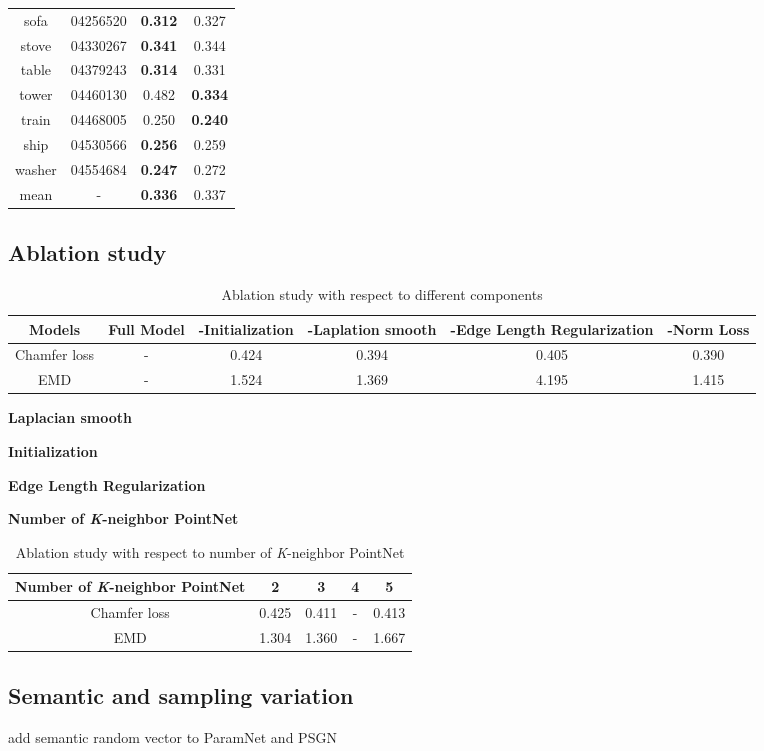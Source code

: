 \begin{table}
\begin{tabular}{c c c c}
		sofa & 04256520 & {\color{blue}\textbf{0.312}} & 0.327\\
		stove & 04330267 & {\color{blue}\textbf{0.341}} & 0.344\\
		table & 04379243 & {\color{blue}\textbf{0.314}} & 0.331\\
		tower & 04460130 & 0.482 & {\color{blue}\textbf{0.334}}\\
		train & 04468005 & 0.250 & {\color{blue}\textbf{0.240}}\\
		ship  & 04530566 & {\color{blue}\textbf{0.256}} & 0.259\\
		washer &  04554684 & {\color{blue}\textbf{0.247}} & 0.272\\
		mean   &     -     & {\color{blue}\textbf{0.336}} & 0.337
	\end{tabular}
\end{table}

\subsection{Ablation study}
\begin{table*}
	\caption{Ablation study with respect to different components}
	\label{tab:ablation}
	\centering
	\begin{tabular}{c | c c c c c}
		Models &  Full Model  & -Initialization & -Laplation smooth & -Edge Length Regularization & -Norm Loss \\
		\hline
		Chamfer loss & - & 0.424 & 0.394 & 0.405  & 0.390\\
		EMD			 & - & 1.524 & 1.369 & 4.195  & 1.415
	\end{tabular}
\end{table*}
\noindent\textbf{Laplacian smooth}

\noindent\textbf{Initialization}

\noindent\textbf{Edge Length Regularization}

\noindent\textbf{Number of \textit{K}-neighbor PointNet}
\begin{table*}
	\caption{Ablation study with respect to number of \textit{K}-neighbor PointNet}
	\label{tab:pointnet}
	\centering
	\begin{tabular}{c | c c c c}
		Number of \textit{K}-neighbor PointNet &  2 & 3 & 4 & 5 \\
		\hline
		Chamfer loss & 0.425 &  0.411 & - & 0.413 \\
		EMD			 & 1.304 &  1.360 & - & 1.667
	\end{tabular}
\end{table*}
\subsection{Semantic and sampling variation}
add semantic random vector to ParamNet and PSGN\cite{PSGN}